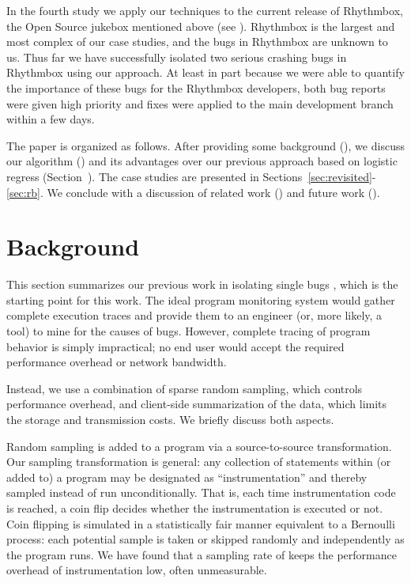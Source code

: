 \documentclass{sig-alternate}
\begin{document}
In the fourth study we apply our techniques to the current release
of Rhythmbox, the Open Source jukebox mentioned above (see
).  Rhythmbox is the largest and most complex of our
case studies, and the bugs in Rhythmbox are unknown to us.  Thus far
we have successfully isolated two serious crashing bugs in Rhythmbox
using our approach.  At least in part because we were able to
quantify the importance of these bugs for the Rhythmbox developers, both
bug reports were given high priority and fixes were applied to the
main development branch within a few days.


The paper is organized as follows.  After providing some background
(), we discuss our algorithm
() and its advantages over our previous approach
based on logistic regress (Section~\cite{sec-comparison}).  The case studies
are presented in Sections~\ref{sec:revisited}-\ref{sec:rb}.  We conclude with a
discussion of related work () and future
work (). 

\section{Background}
\label{sec:background}

This section summarizes our previous work in isolating single bugs
\cite{PLDI`03*141,Zheng:2003:SDSP}, which is the starting point for
this work.  The ideal program monitoring system would gather complete
execution traces and provide them to an engineer (or, more likely, a
tool) to mine for the causes of bugs.  However, complete tracing of
program behavior is simply impractical; no end user would accept the
required performance overhead or network bandwidth.

Instead, we use a combination of sparse random sampling, which controls
performance overhead, and client-side summarization of the data, which
limits the storage and transmission costs.  We briefly discuss
both aspects.

Random sampling is added to a program via a source-to-source transformation.
Our sampling transformation is general: any collection of
statements within (or added to) a program may be designated as
``instrumentation'' and thereby sampled instead of run
unconditionally.  That is, each time instrumentation code is reached,
a coin flip decides whether the instrumentation is executed or not.
Coin flipping is simulated in a statistically fair
manner equivalent to a Bernoulli process: each potential sample is
taken or skipped randomly and independently as the program runs.
We have found that a sampling rate of  keeps the performance overhead
of instrumentation low, often unmeasurable.
\end{document}
